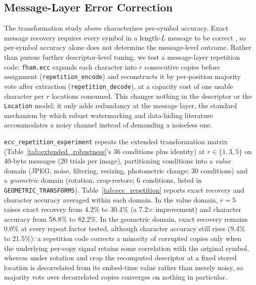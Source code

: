 \documentclass[preprint,12pt]{elsarticle}
\theoremstyle{plain}
\providecommand{\DIFaddtex}[1]{{\protect\color{blue} \sf #1}} %
\providecommand{\DIFdeltex}[1]{{\protect\color{red} \scriptsize #1}} %
\providecommand{\DIFaddbegin}{} %
\providecommand{\DIFaddend}{} %
\providecommand{\DIFdelbegin}{} %
\providecommand{\DIFdelend}{} %
\providecommand{\DIFadd}[1]{\texorpdfstring{\DIFaddtex{#1}}{#1}} %
\providecommand{\DIFdel}[1]{\texorpdfstring{\DIFdeltex{#1}}{}} %
\providecommand{\DIFscaledelfig}{0.5}
\newlength{\DIFdelgraphicswidth} %
\newlength{\DIFdelgraphicsheight} %
\providecommand{\DIFaddincludegraphics}[2][]{{\color{blue}\fbox{\DIFOincludegraphics[#1]{#2}}}} %
\providecommand{\DIFdelincludegraphics}[2][]{%
\sbox{\DIFdelgraphicsbox}{\DIFOincludegraphics[#1]{#2}}%
\settoboxwidth{\DIFdelgraphicswidth}{\DIFdelgraphicsbox} %
\settoboxtotalheight{\DIFdelgraphicsheight}{\DIFdelgraphicsbox} %
\scalebox{\DIFscaledelfig}{%
\parbox[b]{\DIFdelgraphicswidth}{\usebox{\DIFdelgraphicsbox}\\[-\baselineskip] \rule{\DIFdelgraphicswidth}{0em}}\llap{\resizebox{\DIFdelgraphicswidth}{\DIFdelgraphicsheight}{%
\setlength{\unitlength}{\DIFdelgraphicswidth}%
\begin{picture}(1,1)%
\thicklines\linethickness{2pt} %
{\color[rgb]{1,0,0}\put(0,0){\framebox(1,1){}}}%
{\color[rgb]{1,0,0}\put(0,0){\line( 1,1){1}}}%
{\color[rgb]{1,0,0}\put(0,1){\line(1,-1){1}}}%
\end{picture}%
}\hspace*{3pt}}} %
} %
\DeclareRobustCommand{\DIFaddbegin}{\DIFOaddbegin \let\includegraphics\DIFaddincludegraphics} %
\DeclareRobustCommand{\DIFaddend}{\DIFOaddend \let\includegraphics\DIFOincludegraphics} %
\DeclareRobustCommand{\DIFdelbegin}{\DIFOdelbegin \let\includegraphics\DIFdelincludegraphics} %
\DeclareRobustCommand{\DIFdelend}{\DIFOaddend \let\includegraphics\DIFOincludegraphics} %
\renewcommand{\DIFdel}[1]{}
\renewcommand{\DIFdelincludegraphics}[2][]{}
\begin{document}
\DIFaddend \subsection{Message-Layer Error Correction}
\label{sec:ecc}

The transformation study above characterizes \DIFdelbegin \DIFdel{a }\DIFdelend per-symbol \DIFdelbegin \DIFdel{failure profile,
not an exact-recovery guarantee: even a substantial per-character accuracyimprovement cannot, by itself, raise the probability that all symbols of a
length-$L$ message survive simultaneously, since exact }\DIFdelend \DIFaddbegin \DIFadd{accuracy. Exact
message }\DIFaddend recovery requires every symbol \DIFaddbegin \DIFadd{in a length-$L$ message }\DIFaddend to be correct\DIFaddbegin \DIFadd{,
so per-symbol accuracy alone does not determine the message-level outcome}\DIFaddend . Rather than pursue further descriptor-level
tuning, we test a message-layer repetition code: \texttt{fham.ecc} expands
each character into $r$ consecutive copies before assignment
(\texttt{repetition\_encode}) and reconstructs it by per-position majority
vote after extraction (\texttt{repetition\_decode}), at a capacity cost of
one usable character per $r$ locations consumed. This changes nothing in
the descriptor or the \texttt{Location} model; it only adds redundancy at
the message layer, the standard mechanism by which robust watermarking and
data-hiding literature accommodates a noisy channel instead of demanding a
noiseless one.

\texttt{ecc\_repetition\_experiment} repeats the extended transformation
matrix (Table~\ref{tab:extended_robustness}'s 36 conditions plus identity)
at $r \in \{1,3,5\}$ on 40-byte messages (20 trials per image), partitioning
conditions into a \emph{value} domain (JPEG, noise, filtering, resizing,
photometric change; 30 conditions) and a \emph{geometric} domain (rotation,
crop-restore; 6 conditions, listed in \texttt{GEOMETRIC\_TRANSFORMS}).
Table~\ref{tab:ecc_repetition} reports exact recovery and character accuracy
averaged within each domain. In the value domain, $r=5$ raises exact
recovery from 4.2\% to 30.4\% (a 7.2$\times$ improvement) and character
accuracy from 58.8\% to 82.2\%. In the geometric domain, exact recovery
remains 0.0\% at every repeat factor tested, although character accuracy
still rises (9.4\% to 21.5\%): a repetition code corrects a minority of
corrupted copies only when the underlying per-copy signal retains some
correlation with the original symbol, whereas under rotation and crop the
recomputed descriptor at a fixed stored location is decorrelated from its
embed-time value rather than merely noisy, so majority vote over
decorrelated copies converges on nothing in particular.
\end{document}
